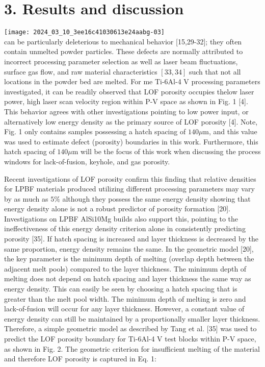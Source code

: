 \documentclass[10pt]{article}
\begin{document}
\section*{3. Results and discussion}
\texttt{[image: 2024\_03\_10\_3ee16c41030613e24aabg-03]}\\
can be particularly deleterious to mechanical behavior [15,29-32]; they often contain unmelted powder particles. These defects are normally attributed to incorrect processing parameter selection as well as laser beam fluctuations, surface gas flow, and raw material characteristics $[33,34]$ such that not all locations in the powder bed are melted. For me Ti-6Al-4 V processing parameters investigated, it can be readily observed that LOF porosity occupies thelow laser power, high laser scan velocity region within P-V space as shown in Fig. 1 [4]. This behavior agrees with other investigations pointing to low power input, or alternatively low energy density as the primary source of LOF porosity [4]. Note, Fig. 1 only contains samples possessing a hatch spacing of $140 \mu \mathrm{m}$, and this value was used to estimate defect (porosity) boundaries in this work. Furthermore, this hatch spacing of $140 \mu \mathrm{m}$ will be the focus of this work when discussing the process windows for lack-of-fusion, keyhole, and gas porosity.

Recent investigations of LOF porosity confirm this finding that relative densities for LPBF materials produced utilizing different processing parameters may vary by as much as $5 \%$ although they possess the same energy density showing that energy density alone is not a robust predictor of porosity formation [20]. Investigations on LPBF AlSi10Mg builds also support this, pointing to the ineffectiveness of this energy density criterion alone in consistently predicting porosity [35]. If hatch spacing is increased and layer thickness is decreased by the same proportion, energy density remains the same. In the geometric model [20], the key parameter is the minimum depth of melting (overlap depth between the adjacent melt pools) compared to the layer thickness. The minimum depth of melting does not depend on hatch spacing and layer thickness the same way as energy density. This can easily be seen by choosing a hatch spacing that is greater than the melt pool width. The minimum depth of melting is zero and lack-of-fusion will occur for any layer thickness. However, a constant value of energy density can still be maintained by a proportionally smaller layer thickness. Therefore, a simple geometric model as described by Tang et al. [35] was used to predict the LOF porosity boundary for Ti-6Al-4 V test blocks within P-V space, as shown in Fig. 2. The geometric criterion for insufficient melting of the material and therefore LOF porosity is captured in Eq. 1:
\end{document}

